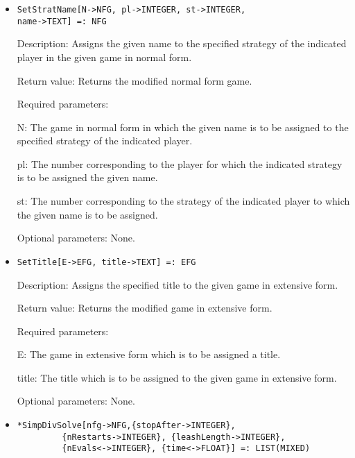 \begin{itemize}
\item

\protect \large \begin{verbatim}
SetStratName[N->NFG, pl->INTEGER, st->INTEGER,
name->TEXT] =: NFG
\end{verbatim}\normalsize

\bd
\item
[Description:] Assigns the given name to the specified strategy of the
indicated player in the given game in normal form.
\item
[Return value:] Returns the modified normal form game.
\item
[Required parameters:]\hfil\null
	
\bd
\item
[N:] The game in normal form in which the given name is to be
assigned to the specified strategy of the indicated player.
\item
[pl:] The number corresponding to the player for which the indicated
strategy is to be assigned the given name.
\item
[st:] The number corresponding to the strategy of the indicated player
to which the given name is to be assigned.
\ed

\item
[Optional parameters:] None.

\ed

\item

\protect \large \begin{verbatim}
SetTitle[E->EFG, title->TEXT] =: EFG
\end{verbatim}\normalsize

\bd
\item
[Description:] Assigns the specified title to the given game in
extensive form.
\item
[Return value:] Returns the modified game in extensive form.
\item
[Required parameters:]\hfil\null
	
\bd
\item
[E:] The game in extensive form which is to be assigned a title.
\item
[title:] The title which is to be assigned to the given game in
extensive form.
\ed

\item
[Optional parameters:] None.
\ed

\item
\protect \large \begin{verbatim}
*SimpDivSolve[nfg->NFG,{stopAfter->INTEGER}, 
         {nRestarts->INTEGER}, {leashLength->INTEGER},
         {nEvals<->INTEGER}, {time<->FLOAT}] =: LIST(MIXED)
\end{verbatim}\normalsize


\end{itemize}
